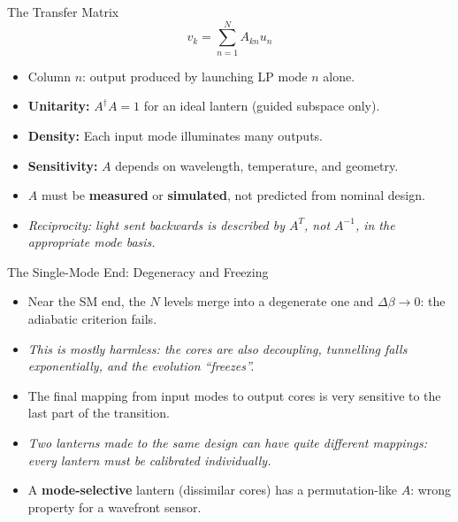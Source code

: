 \documentclass[aspectratio=169,10pt]{beamer}
\begin{document}
\begin{frame}{The Transfer Matrix}
\[
    v_k = \sum_{n=1}^{N} A_{kn} u_n
\]
\begin{itemize}
    \item Column \(n\): output produced by launching LP mode \(n\) alone.
    \item \textbf{Unitarity:} \(A^\dagger A = 1\) for an ideal lantern (guided subspace only).
    \item \textbf{Density:} Each input mode illuminates many outputs.
    \item \textbf{Sensitivity:} \(A\) depends on wavelength, temperature, and geometry.
    \item \(A\) must be \textbf{measured} or \textbf{simulated}, not predicted from nominal design.
    \item \emph{Reciprocity: light sent backwards is described by $A^T$, not $A^{-1}$, in the appropriate mode basis.}
\end{itemize}
\end{frame}

\begin{frame}{The Single-Mode End: Degeneracy and Freezing}
\begin{itemize}
    \item Near the SM end, the \(N\) levels merge into a degenerate one and \(\Delta\beta \to 0\): the adiabatic criterion fails.
    \item \emph{This is mostly harmless: the cores are also decoupling, tunnelling falls exponentially, and the evolution ``freezes''.}
    \item The final mapping from input modes to output cores is very sensitive to the last part of the transition.
    \item \emph{Two lanterns made to the same design can have quite different mappings: every lantern must be calibrated individually.}
    \item A \textbf{mode-selective} lantern (dissimilar cores) has a permutation-like \(A\): wrong property for a wavefront sensor.
\end{itemize}
\end{frame}

\end{document}
